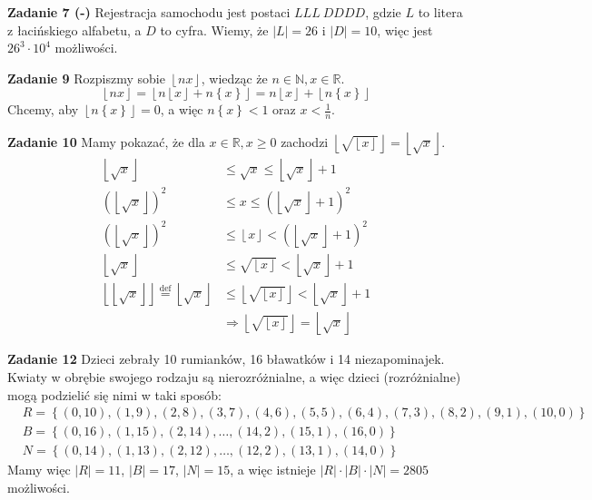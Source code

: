 \documentclass[a4paper,12pt]{article}
\newcommand{\floor}[1]{\left\lfloor #1 \right\rfloor}
\newcommand{\set}[1]{\left \{ #1 \right \}}
\newcommand{\pair}[1]{\left( #1 \right)}
\begin{document}
\noindent \newline \textbf{Zadanie 7 (-)} \newline
Rejestracja samochodu jest postaci $LLL\ DDDD$, gdzie $L$ to litera z łacińskiego alfabetu, a $D$ to cyfra. Wiemy, że $|L|=26$ i $|D|=10$, więc jest $26^3\cdot 10^4$ możliwości.

\newpage
\noindent \newline \textbf{Zadanie 9} \newline
Rozpiszmy sobie $\floor{nx}$, wiedząc że $n\in\mathbb{N}, x\in\mathbb{R}$.
\[
	\floor{nx} = \floor{ n\floor{x} + n \left\{ x \right\}} = n \floor{x} + \floor{n \left\{ x \right\}}
\]
Chcemy, aby $\floor{n \left\{ x \right\}} = 0$, a więc $n \left\{ x \right\} < 1$ oraz $x < \frac{1}{n}$.

\noindent \newline \textbf{Zadanie 10} \newline
Mamy pokazać, że dla $x \in \mathbb{R}, x \geq 0$ zachodzi $\floor{\sqrt{\floor{x}}} = \floor{\sqrt{x}}$.
\[
\begin{aligned}
	\floor{\sqrt{x}} &\leq \sqrt{x} \leq \floor{\sqrt{x}} + 1 \\
	\left(\floor{\sqrt{x}}\right)^2 &\leq x \leq \left(\floor{\sqrt{x}} + 1\right)^2 \\
	\left(\floor{\sqrt{x}}\right)^2 &\leq \floor{x} < \left(\floor{\sqrt{x}} + 1\right)^2 \\
	\floor{\sqrt{x}} &\leq \sqrt{\floor{x}} < \floor{\sqrt{x}} + 1 \\
	\floor{\floor{\sqrt{x}}} \stackrel{\text{def}}{=} \floor{\sqrt{x}} &\leq \floor{\sqrt{\floor{x}}} < \floor{\sqrt{x}} + 1 \\
	&\Rightarrow \floor{\sqrt{\floor{x}}} = \floor{\sqrt{x}}
\end{aligned}
\]


\noindent \newline \textbf{Zadanie 12} \newline
Dzieci zebrały 10 rumianków, 16 bławatków i 14 niezapominajek. Kwiaty w obrębie swojego rodzaju są nierozróżnialne, a więc dzieci (rozróżnialne) mogą podzielić się nimi w taki sposób:
$$
\begin{aligned}
&R = \set{ \pair{0,10}, \pair{1,9}, \pair{2,8}, \pair{3,7}, \pair{4,6}, \pair{5,5}, \pair{6,4}, \pair{7,3}, \pair{8,2}, \pair{9,1}, \pair{10,0} } \\
&B = \set{ \pair{0, 16},\pair{1, 15}, \pair{2, 14}, \ldots, \pair{14, 2}, \pair{15, 1}, \pair{16, 0} } \\
&N = \set{ \pair{0, 14},\pair{1, 13}, \pair{2, 12}, \ldots, \pair{12, 2}, \pair{13, 1}, \pair{14, 0} }
\end{aligned}
$$
\noindent Mamy więc $|R| = 11$, $|B| = 17$, $|N| = 15$, a więc istnieje $|R| \cdot |B| \cdot |N| = 2805$ możliwości.
\end{document}
